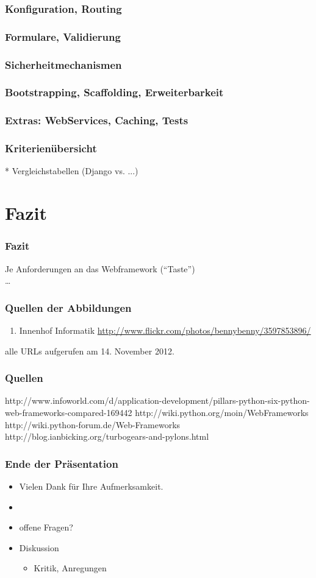 \documentclass[
    t,
    smaller,
    compress,
]{beamer}
\begin{document}
\begin{frame}
  \frametitle{Konfiguration, Routing}
\end{frame}


\begin{frame}
  \frametitle{Formulare, Validierung}
\end{frame}


\begin{frame}
  \frametitle{Sicherheitmechanismen}
\end{frame}


\begin{frame}
  \frametitle{Bootstrapping, Scaffolding, Erweiterbarkeit}
\end{frame}


\begin{frame}
  \frametitle{Extras: WebServices, Caching, Tests}
\end{frame}


\begin{frame}
  \frametitle{Kriterienübersicht}
 * Vergleichstabellen (Django vs. ...)
\end{frame}


\section{Fazit}
\begin{frame}
  \frametitle{Fazit}

  Je Anforderungen an das Webframework (“Taste”)\\
  \dots
\end{frame}


\begin{frame}
  \frametitle{Quellen der Abbildungen}
  \footnotesize
  \begin{enumerate}[<1->]
    \item Innenhof Informatik
        \url{http://www.flickr.com/photos/bennybenny/3597853896/} \label{illu:1}
  \end{enumerate}
  alle URLs aufgerufen am 14. November 2012.
\end{frame}


\begin{frame}
  \frametitle{Quellen}
http://www.infoworld.com/d/application-development/pillars-python-six-python-web-frameworks-compared-169442
http://wiki.python.org/moin/WebFrameworks
http://wiki.python-forum.de/Web-Frameworks
http://blog.ianbicking.org/turbogears-and-pylons.html
\end{frame}


\begin{frame}
    \frametitle{Ende der Präsentation}
    \LARGE
    \begin{itemize}[<1->]
        \item Vielen Dank für Ihre Aufmerksamkeit.
        \item
        \item offene Fragen?
        \item Diskussion
        \begin{itemize}[<1->]
          \Large
          \item Kritik, Anregungen
        \end{itemize}
    \end{itemize}
\end{frame}
\end{document}
